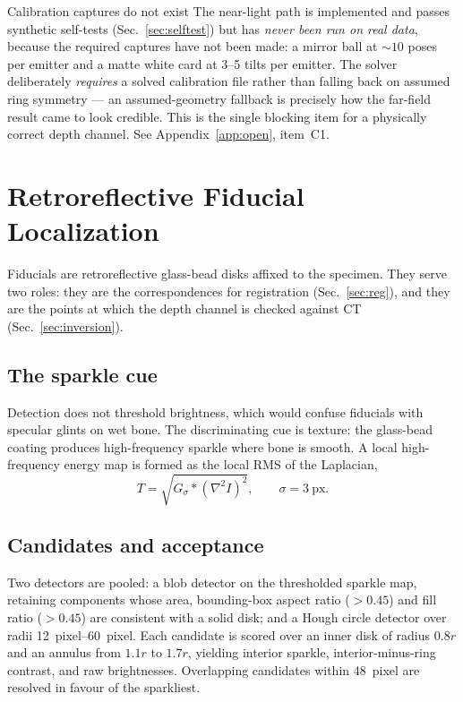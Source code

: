 \documentclass[journal,10pt]{IEEEtran}
\begin{document}
\begin{todobox}{Calibration captures do not exist}
The near-light path is implemented and passes synthetic self-tests
(Sec.~\ref{sec:selftest}) but has \emph{never been run on real data}, because the
required captures have not been made: a mirror ball at ${\sim}10$ poses per
emitter and a matte white card at \numrange{3}{5} tilts per emitter. The solver
deliberately \emph{requires} a solved calibration file rather than falling back
on assumed ring symmetry --- an assumed-geometry fallback is precisely how the
far-field result came to look credible. This is the single blocking item for a
physically correct depth channel. See Appendix~\ref{app:open}, item~C1.
\end{todobox}

\section{Retroreflective Fiducial Localization}\label{sec:fiducials}
Fiducials are retroreflective glass-bead disks affixed to the specimen. They
serve two roles: they are the correspondences for registration
(Sec.~\ref{sec:reg}), and they are the points at which the depth channel is
checked against CT (Sec.~\ref{sec:inversion}).

\subsection{The sparkle cue}
Detection does not threshold brightness, which would confuse fiducials with
specular glints on wet bone. The discriminating cue is texture: the glass-bead
coating produces high-frequency sparkle where bone is smooth. A local
high-frequency energy map is formed as the local RMS of the Laplacian,
\begin{equation}
T = \sqrt{G_\sigma * (\nabla^2 I)^2}, \qquad \sigma = 3\ \text{px} .
\end{equation}

\subsection{Candidates and acceptance}
Two detectors are pooled: a blob detector on the thresholded sparkle map,
retaining components whose area, bounding-box aspect ratio ($>0.45$) and fill
ratio ($>0.45$) are consistent with a solid disk; and a Hough circle detector
over radii \SIrange{12}{60}{pixel}. Each candidate is scored over an inner disk
of radius $0.8r$ and an annulus from $1.1r$ to $1.7r$, yielding interior
sparkle, interior-minus-ring contrast, and raw brightnesses. Overlapping
candidates within \SI{48}{pixel} are resolved in favour of the sparkliest.
\end{document}
